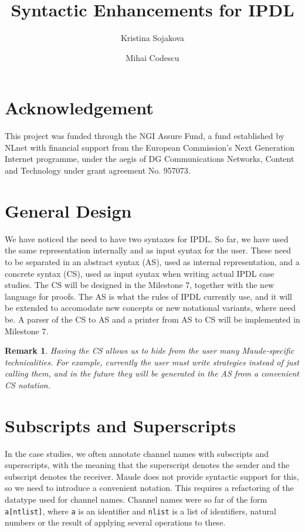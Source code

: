 \documentclass{article}
\title{Syntactic Enhancements for IPDL}
\author{Kristina Sojakova \and Mihai Codescu}
\date{}
\newtheorem{remark}{Remark}
\begin{document}
\maketitle
\section*{\small Acknowledgement}
This project was funded through the NGI Assure Fund, a fund established by NLnet with financial support from the European Commission's Next Generation Internet programme, under the aegis of DG Communications Networks, Content and Technology under grant agreement No. 957073.
\section{General Design}

We have noticed the need to have two syntaxes for IPDL. So far, we have used the same representation internally and as input syntax for the user. These need to be separated in an abstract syntax (AS), used as internal
representation, and a concrete syntax (CS), used as input syntax when
writing actual IPDL case studies. The CS will be designed in the Milestone 7, together with the new language for proofs. The AS is what the rules of IPDL currently use, and it will be extended to accomodate new concepts or new notational variants, where need be. A parser of the CS to AS and a printer from AS to CS will be implemented in Milestone 7. 

\begin{remark}
Having the CS allows us to hide from the user many Maude-specific
technicalities. For example, currently the user must write strategies
instead of just calling them, and in the future 
they will be generated in the AS from a
convenient CS notation.
\end{remark}

\section{Subscripts and Superscripts}

In the case studies, we often annotate channel names with subscripts and superscripts, with the meaning that the superscript denotes the sender and the subscript denotes the receiver. Maude does not provide syntactic support for this, so we need to introduce a convenient notation. This requires a
refactoring of the datatype used for channel names. Channel names were so far of the form \verb+a[ntlist]+, where \verb+a+ is an identifier and \verb+nlist+ is a list of identifiers, natural numbers or the result of applying several operations to these.
\end{document}
